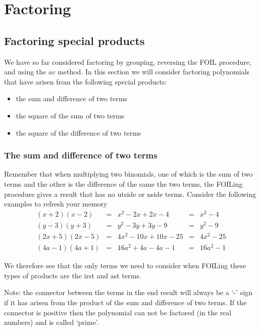 \chapter{Factoring}
\minitoc

\section{Factoring special products}
%
We have so far considered factoring by grouping, reversing
the \gls{FOIL} procedure, and using the $ac$ method. In this section we will consider factoring
polynomials that have arisen from the following special products:
\begin{itemize}
	\item the sum and difference of two terms
	\item the square of the sum of two terms
	\item the square of the difference of two terms
\end{itemize} 

\subsection{The sum and difference of two terms}
Remember that when multiplying two binomials, one of which is the sum of two
terms and the other is the difference of the same the two terms, the FOILing procedure
gives a result that has no {\color{blue}{O}}utside or {\color{blue}{I}}nside terms. Consider the following examples
to refresh your memory
\[
	\begin{array}{lclcl}
		(x+2)(x-2)   & = & x^2-2x+2x-4         & = & x^2-4   \\
		(y-3)(y+3)   & = & y^2-3y+3y-9         & = & y^2-9   \\
		(2x+5)(2x-5) & = & 4x^2 -10x + 10x -25 & = & 4x^2-25 \\
		(4a-1)(4a+1) & = & 16a^2+4a-4a -1      & = & 16a^2-1 
	\end{array}
\]

We therefore see that the only terms we need to consider when FOILing these types of products are
the  {\color{blue}{F}}irst and  {\color{blue}{L}}ast terms. 

Note: the connector between the terms in the end result will always be a `-' sign if it has arisen
from the product of the sum and difference of two terms. If the connector is positive then
the \gls{polynomial} can not be factored (in the real numbers) and is called `\gls{prime}'.

